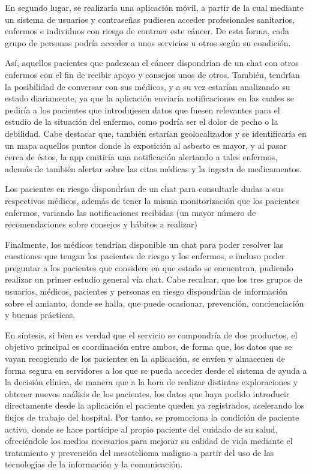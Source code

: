 \documentclass{article}
\begin{document}
En segundo lugar, se realizaría una aplicación móvil, a partir	de  la
cual mediante un sistema de usuarios y	contraseñas  pudiesen  acceder
profesionales sanitarios, enfermos e individuos con riesgo de contraer
este cáncer.  De esta forma, cada grupo de personas podría  acceder  a
unos servicios u otros según su condición.

Así, aquellos pacientes que padezcan el cáncer dispondrían de un  chat
con otros enfermos con el fin de recibir  apoyo  y  consejos  unos  de
otros.	También, tendrían la posibilidad de conversar con sus médicos,
y a su vez estarían  analizando  su  estado  diariamente,  ya  que  la
aplicación enviaría notificaciones en las  cuales  se  pediría	a  los
pacientes que introdujesen datos que fuesen relevantes para el estudio
de la situación del enfermo, como podría ser el dolor de  pecho  o  la
debilidad.  Cabe destacar que, también estarían  geolocalizados  y  se
identificaría en un  mapa  aquellos  puntos  donde  la	exposición  al
asbesto es mayor, y al pasar cerca  de	éstos,	la  app  emitiría  una
notificación alertando a tales enfermos,  además  de  también  alertar
sobre	las   citas   médicas	y   la	 ingesta   de	 medicamentos.

Los pacientes en riesgo dispondrían de un chat para consultarle  dudas
a sus respectivos médicos, además de tener la misma monitorización que
los pacientes enfermos,  variando  las	notificaciones	recibidas  (un
mayor número de recomendaciones sobre consejos y hábitos  a  realizar)

Finalmente,  los  médicos  tendrían  disponible  un  chat  para  poder
resolver las cuestiones que tengan  los  pacientes  de	riesgo	y  los
enfermos, e incluso poder preguntar a los pacientes que  considere  en
que estado se encuentran, pudiendo realizar un primer estudio  general
vía chat.  Cabe recalcar, que los tres grupos  de  usuarios,  médicos,
pacientes y personas en riesgo dispondrían  de	información  sobre  el
amianto,  donde   se   halla,	que   puede   ocasionar,   prevención,
concienciación y buenas prácticas.

En síntesis, si bien es verdad que el servicio se  compondría  de  dos
productos, el objetivo principal es coordinación entre ambos, de forma
que, los datos	que  se  vayan	recogiendo  de	los  pacientes	en  la
aplicación, se envíen y almacenen de forma segura en servidores a  los
que se pueda acceder desde el sistema de ayuda a la decisión  clínica,
de manera que a la hora de realizar distintas exploraciones y  obtener
nuevos análisis de los pacientes, los datos que haya podido introducir
directamente desde la aplicación el paciente  queden  ya  registrados,
acelerando  los  flujos  de  trabajo  del  hospital.   Por  tanto,  se
promociona la condición de paciente activo, donde se hace partícipe al
propio paciente del cuidado  de  su  salud,  ofreciéndole  los	medios
necesarios para mejorar su calidad de vida mediante el	tratamiento  y
prevención del mesotelioma maligno a partir del uso de las tecnologías
de la información y la comunicación.
\end{document}
